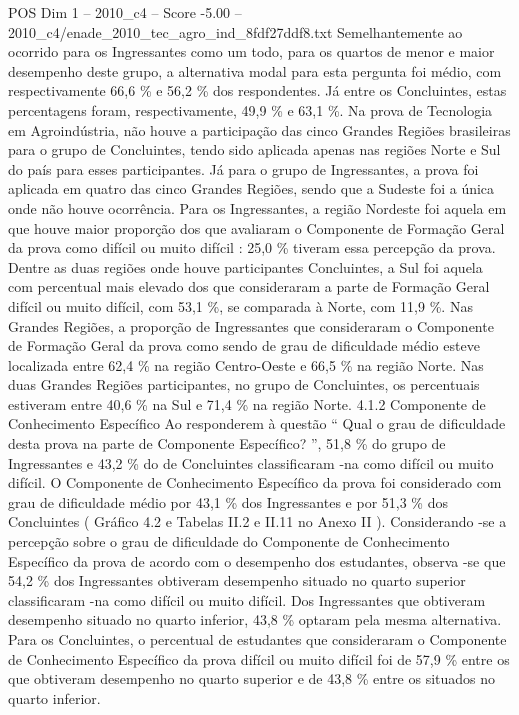 \begin{textsample}{POS Dim 1 – 2010\_c4 – Score -5.00 – 2010\_c4/enade\_2010\_tec\_agro\_ind\_8fdf27ddf8.txt}
Semelhantemente ao ocorrido para os Ingressantes como um todo, para os quartos de menor e maior desempenho deste grupo, a alternativa modal para esta pergunta foi médio, com respectivamente 66,6 \% e 56,2 \% dos respondentes.
Já entre os Concluintes, estas percentagens foram, respectivamente, 49,9 \% e 63,1 \%.
Na prova de Tecnologia em Agroindústria, não houve a participação das cinco Grandes Regiões brasileiras para o grupo de Concluintes, tendo sido aplicada apenas nas regiões Norte e Sul do país para esses participantes.
Já para o grupo de Ingressantes, a prova foi aplicada em quatro das cinco Grandes Regiões, sendo que a Sudeste foi a única onde não houve ocorrência.
Para os Ingressantes, a região Nordeste foi aquela em que houve maior proporção dos que avaliaram o Componente de Formação Geral da prova como difícil ou muito difícil : 25,0 \% tiveram essa percepção da prova.
Dentre as duas regiões onde houve participantes Concluintes, a Sul foi aquela com percentual mais elevado dos que consideraram a parte de Formação Geral difícil ou muito difícil, com 53,1 \%, se comparada à Norte, com 11,9 \%.
Nas Grandes Regiões, a proporção de Ingressantes que consideraram o Componente de Formação Geral da prova como sendo de grau de dificuldade médio esteve localizada entre 62,4 \% na região Centro-Oeste e 66,5 \% na região Norte.
Nas duas Grandes Regiões participantes, no grupo de Concluintes, os percentuais estiveram entre 40,6 \% na Sul e 71,4 \% na região Norte. 4.1.2 Componente de Conhecimento Específico Ao responderem à questão “ Qual o grau de dificuldade desta prova na parte de Componente Específico? ”, 51,8 \% do grupo de Ingressantes e 43,2 \% do de Concluintes classificaram -na como difícil ou muito difícil.
O Componente de Conhecimento Específico da prova foi considerado com grau de dificuldade médio por 43,1 \% dos Ingressantes e por 51,3 \% dos Concluintes ( Gráfico 4.2 e Tabelas II.2 e II.11 no Anexo II ).
Considerando -se a percepção sobre o grau de dificuldade do Componente de Conhecimento Específico da prova de acordo com o desempenho dos estudantes, observa -se que 54,2 \% dos Ingressantes obtiveram desempenho situado no quarto superior classificaram -na como difícil ou muito difícil.
Dos Ingressantes que obtiveram desempenho situado no quarto inferior, 43,8 \% optaram pela mesma alternativa.
Para os Concluintes, o percentual de estudantes que consideraram o Componente de Conhecimento Específico da prova difícil ou muito difícil foi de 57,9 \% entre os que obtiveram desempenho no quarto superior e de 43,8 \% entre os situados no quarto inferior.

\end{textsample}
